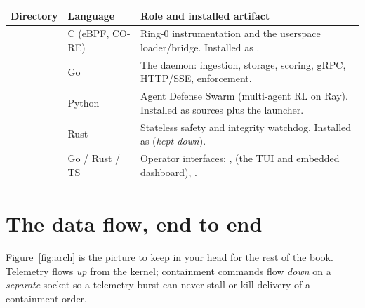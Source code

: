 \begin{center}
\small
\begin{tabularx}{\textwidth}{@{}L{3.6cm}L{2.4cm}Y@{}}
\toprule
\textbf{Directory} & \textbf{Language} & \textbf{Role and installed artifact}\\
\midrule
{} & C (eBPF, CO-RE) & Ring-0 instrumentation and the userspace loader/bridge. Installed as .\\
 & Go & The  daemon: ingestion, storage, scoring, gRPC, HTTP/SSE, enforcement.\\
 & Python & Agent Defense Swarm (multi-agent RL on Ray). Installed as sources plus the  launcher.\\
 & Rust & Stateless safety and integrity watchdog. Installed as  (\emph{kept down}).\\
 & Go / Rust / TS & Operator interfaces: ,  (the TUI and embedded dashboard), .\\
\bottomrule
\end{tabularx}
\end{center}

\section{The data flow, end to end}
Figure~\ref{fig:arch} is the picture to keep in your head for the rest of the book. Telemetry flows
\emph{up} from the kernel; containment commands flow \emph{down} on a \emph{separate} socket so a
telemetry burst can never stall or kill delivery of a containment order.


